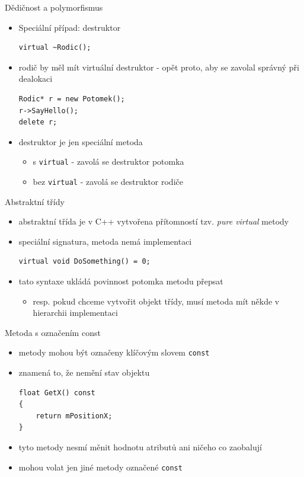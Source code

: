 \documentclass{beamer}
\begin{document}
\begin{xframe}{Dědičnost a polymorfismus}
	\begin{itemize}
		\item Speciální případ: destruktor
\begin{lstlisting}[basicstyle=\fontsize{9}{10}\selectfont\ttfamily]
virtual ~Rodic();
\end{lstlisting}
		\item rodič by měl mít virtuální destruktor - opět proto, aby se zavolal správný při dealokaci
\begin{lstlisting}[basicstyle=\fontsize{9}{10}\selectfont\ttfamily]
Rodic* r = new Potomek();
r->SayHello();
delete r;
\end{lstlisting}
		\item destruktor je jen speciální metoda
			\begin{itemize}
				\item s \texttt{virtual} - zavolá se destruktor potomka
				\item bez \texttt{virtual} - zavolá se destruktor rodiče
			\end{itemize}
	\end{itemize}
\end{xframe}


\begin{xframe}{Abstraktní třídy}
	\begin{itemize}
		\item abstraktní třída je v C++ vytvořena přítomností tzv. \emph{pure virtual} metody
		\item speciální signatura, metoda nemá implementaci
\begin{lstlisting}[basicstyle=\fontsize{9}{10}\selectfont\ttfamily]
virtual void DoSomething() = 0;
\end{lstlisting}
		\item tato syntaxe ukládá povinnost potomka metodu přepsat
			\begin{itemize}
				\item resp. pokud chceme vytvořit objekt třídy, musí metoda mít někde v hierarchii implementaci
			\end{itemize}
	\end{itemize}
\end{xframe}


\begin{xframe}{Metoda s označením const}
	\begin{itemize}
		\item metody mohou být označeny klíčovým slovem \texttt{const}
		\item znamená to, že nemění stav objektu
\begin{lstlisting}[basicstyle=\fontsize{9}{10}\selectfont\ttfamily]
float GetX() const
{
    return mPositionX;
}
\end{lstlisting}
		\item tyto metody nesmí měnit hodnotu atributů ani ničeho co zaobalují
		\item mohou volat jen jiné metody označené \texttt{const}
	\end{itemize}
\end{xframe}
\end{document}
